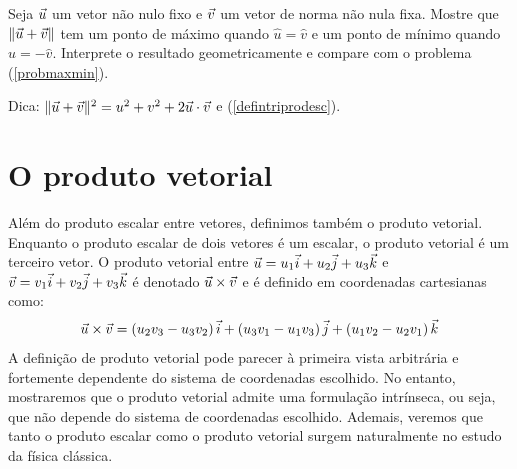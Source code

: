 \begin{exer}Seja $\vec{u}$ um vetor não nulo fixo e $\vec{v}$ um vetor de norma não nula fixa. Mostre que $\|\vec{u}+\vec{v}\|$ tem um ponto de máximo quando $\hat{u}=\hat{v}$ e um ponto de mínimo quando $\hat{u}=-\hat{v}$. Interprete o resultado geometricamente e compare com o problema (\ref{probmaxmin}). 
\end{exer}
 Dica: $\|\vec{u}+\vec{v}\|^2=u^2+v^2+2\vec{u}\cdot\vec{v}$ e (\ref{defintriprodesc}).

\section{O produto vetorial}
Além do produto escalar entre vetores, definimos também o produto vetorial. Enquanto o produto escalar de dois vetores é um escalar, o produto vetorial é um terceiro vetor. O produto vetorial entre $\vec{u}=u_1\vec{i}+u_2\vec{j}+u_3\vec{k}$ e $\vec{v}=v_1\vec{i}+v_2\vec{j}+v_3\vec{k}$ é denotado $\vec{u}\times\vec{v}$ e é definido em coordenadas cartesianas como:
\begin{equation}\label{defprodvec} \vec{u}\times\vec{v}=\left(u_2v_3-u_3v_2\right)\vec{i}+\left(u_3v_1-u_1v_3\right)\vec{j}+\left(u_1v_2-u_2v_1\right)\vec{k}
\end{equation}
A definição de produto vetorial pode parecer à primeira vista arbitrária e fortemente dependente do sistema de coordenadas escolhido. No entanto, mostraremos que  o produto vetorial admite uma formulação intrínseca, ou seja, que não depende do sistema de coordenadas escolhido. Ademais, veremos que tanto o produto escalar como o produto vetorial surgem naturalmente no estudo da física clássica.

